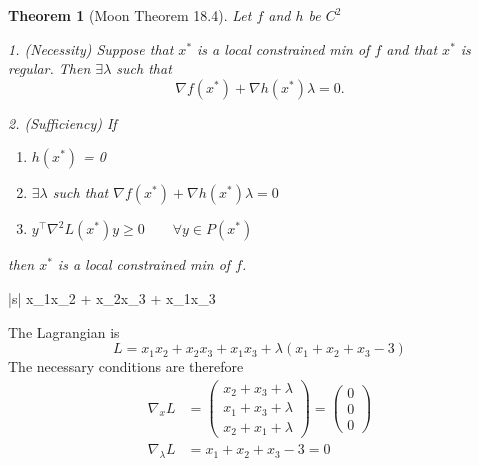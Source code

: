 \documentclass{article}
\newtheorem{theorem}{Theorem}[section]
\begin{document}
	\begin{theorem}[Moon Theorem 18.4]
		Let $f$ and $h$ be $C^2$
		
		1. (Necessity) Suppose that $x^{\ast}$ is a local constrained min of $f$ and that $x^{\ast}$ is regular.  Then $\exists \lambda$ such that
		\[ 
			\nabla f(x^{\ast}) + \nabla h(x^{\ast})\lambda = 0. 
		\]
		
		2. (Sufficiency)  If 
		\begin{enumerate}
		  \item $h(x^{\ast})$ = 0
		  \item $\exists \lambda$ such that $\nabla f(x^{\ast}) + \nabla h(x^{\ast}) \lambda = 0$ 
		  \item $y^\top \nabla^2L(x^{\ast})y \geq 0 \qquad \forall y\in P(x^{\ast})$
		\end{enumerate}
		 then $x^{\ast}$ is a local constrained min of $f$. 		
	\end{theorem}

\par{}
	\begin{maxi*}|s|
		{}{x_1x_2 + x_2x_3 + x_1x_3}{}{}
	\end{maxi*}
	The Lagrangian is
	\[ 
		L = x_1x_2 + x_2x_3 + x_1x_3 + \lambda(x_1 + x_2 + x_3 - 3) 
	\]
	The necessary conditions are therefore
	\begin{align*}
		\nabla_x L  
			&= \begin{pmatrix}
	    		x_2 + x_3 + \lambda\\
	    		x_1 + x_3 + \lambda \\
	    		x_2 + x_1 + \lambda
	  		 \end{pmatrix} 
	  	 = \begin{pmatrix}
	    		0\\0\\0
	  	   \end{pmatrix} \\
		\nabla_\lambda L &= x_1 + x_2 + x_3 - 3 = 0 
	\end{align*}
\end{document}
